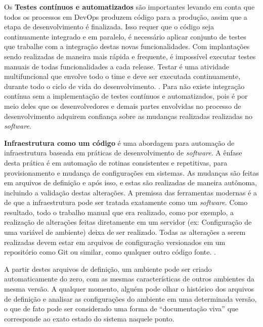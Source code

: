 \documentclass[twoside,english,brazilian]{UNISINOSartigo}
\begin{document}
Os \textbf{Testes contínuos e automatizados} são importantes levando em conta que todos os processos em DevOps produzem código para a produção, assim que a etapa de desenvolvimento é finalizada. Isso requer que o código seja continuamente integrado e em paralelo, é necessário aplicar conjunto de testes que trabalhe com a integração destas novas funcionalidades. Com implantações sendo realizadas de maneira mais rápida e frequente, é impossível executar testes manuais  de todas funcionalidades a cada release. Testar é uma atividade multifuncional que envolve todo o time e deve ser executada continuamente, durante todo o ciclo de vida do desenvolvimento. \cite{Humble2012}.  
Para  não existe integração contínua sem a implementação de testes contínuos e automatizados, pois é por meio deles que os desenvolvedores e demais partes envolvidas no processo de desenvolvimento adquirem confiança sobre as mudanças realizadas realizadas no \textit{software}.

\textbf{Infraestrutura como um código} é uma abordagem para automação de infraestrutura baseada em práticas de desenvolvimento de \textit{software}. A ênfase desta prática é em automação de rotinas consistentes e repetitivas, para provisionamento e mudança de configurações em sistemas. As mudanças são feitas em arquivos de definição e após isso, e estas são realizadas de maneira autônoma, incluindo a validação destas alterações.
A premissa das ferramentas modernas é a de que a infraestrutura pode ser tratada exatamente como um \textit{software}.  Como resultado, todo o trabalho manual que era realizado, como por exemplo, a realização de alterações feitas diretamente em um servidor (ex: Configuração de uma variável de ambiente) deixa de ser realizado. Todas as alterações a serem realizadas devem estar em arquivos de configuração versionados em um repositório como Git ou similar, como qualquer outro código fonte. \citep{Morris2016}.

A partir destes arquivos de definição, um ambiente pode ser criado automaticamente do zero, com as mesmas características de outros ambientes da mesma versão. A qualquer momento, alguém pode olhar o histórico dos arquivos de definição e analisar as configurações do ambiente em uma determinada versão, o que de fato pode ser considerado uma forma de ``documentação viva'' que corresponde ao exato estado do sistema naquele ponto.
\end{document}
